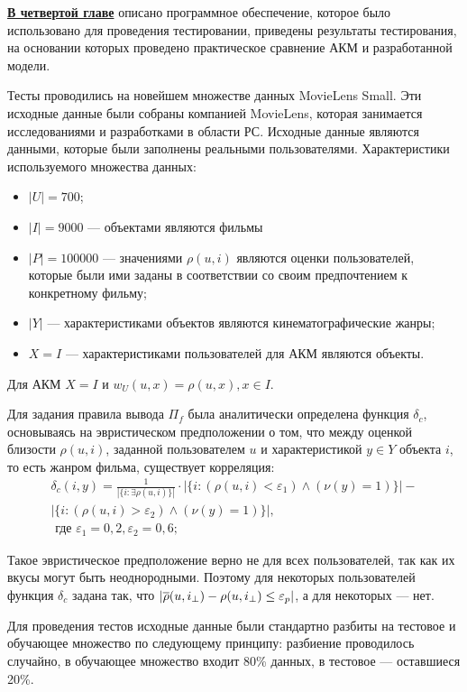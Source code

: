
{\underline {\bf В четвертой главе}} описано программное обеспечение, которое
было использовано для проведения тестировании, приведены результаты
тестирования, на основании которых проведено практическое сравнение АКМ
и разработанной модели.

Тесты проводились на новейшем множестве данных MovieLens Small.
Эти исходные данные были собраны компанией MovieLens, которая
занимается исследованиями и разработками в области РС. Исходные
данные являются данными,
которые были заполнены реальными
пользователями. Характеристики используемого множества данных:
\begin{itemize}
	\item $|U| = 700$;
	\item $|I| = 9000$ --- объектами являются фильмы
	\item $|P| = 100 000$ --- значениями $\rho(u, i)$ являются оценки
		пользователей, которые были ими заданы в соответствии со своим
		предпочтением к конкретному фильму;
	\item $|Y|$ --- характеристиками объектов являются кинематографические
		жанры;
	\item $X = I$ --- характеристиками пользователей для АКМ являются объекты.
\end{itemize}

Для АКМ $X = I$ и $w_U(u, x) = \rho(u,x), x \in I$.

Для задания правила вывода $\Pi_f$ была аналитически определена
функция $\delta_c$, основываясь на эвристическом предположении о том,
что между оценкой близости $\rho(u, i)$, заданной пользователем $u$
и характеристикой $y \in Y$ объекта $i$,
то есть жанром фильма, существует корреляция:
\begin{multline}
	\delta_c(i, y) = \frac{1}{|\{i: \exists \rho(u,i)\}|}
	\cdot
	|\{ i : (\rho(u, i) < \varepsilon_1) \wedge (\nu(y) = 1)\}| -\\
	|\{ i : (\rho(u, i) > \varepsilon_2) \wedge (\nu(y) = 1)\}|, \\
	\text{ где }
	\varepsilon_1 = 0,2, \varepsilon_2 = 0,6;
\end{multline}

Такое эвристическое предположение верно не для всех пользователей, так как
их вкусы могут быть неоднородными. Поэтому для некоторых пользователей функция
$\delta_c$ задана так, что
$|\overline{\rho}(u, i_{\bot}) - \rho(u, i_{\bot}) \le \varepsilon_p|$,
а для некоторых --- нет.

Для проведения тестов исходные данные были
стандартно разбиты на тестовое и обучающее множество по следующему принципу:
разбиение проводилось случайно, в обучающее множество входит
80\% данных, в тестовое --- оставшиеся 20\%.

